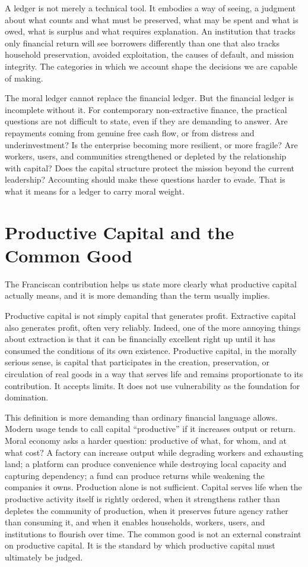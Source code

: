 \documentclass[11pt,a4paper,oneside]{book}
\begin{document}
A ledger is not merely a technical tool. It embodies a way of seeing, a judgment about what counts and what must be preserved, what may be spent and what is owed, what is surplus and what requires explanation. An institution that tracks only financial return will see borrowers differently than one that also tracks household preservation, avoided exploitation, the causes of default, and mission integrity. The categories in which we account shape the decisions we are capable of making.

The moral ledger cannot replace the financial ledger. But the financial ledger is incomplete without it. For contemporary non-extractive finance, the practical questions are not difficult to state, even if they are demanding to answer. Are repayments coming from genuine free cash flow, or from distress and underinvestment? Is the enterprise becoming more resilient, or more fragile? Are workers, users, and communities strengthened or depleted by the relationship with capital? Does the capital structure protect the mission beyond the current leadership? Accounting should make these questions harder to evade. That is what it means for a ledger to carry moral weight.

\section*{Productive Capital and the Common Good}

The Franciscan contribution helps us state more clearly what productive capital actually means, and it is more demanding than the term usually implies.

Productive capital is not simply capital that generates profit. Extractive capital also generates profit, often very reliably. Indeed, one of the more annoying things about extraction is that it can be financially excellent right up until it has consumed the conditions of its own existence. Productive capital, in the morally serious sense, is capital that participates in the creation, preservation, or circulation of real goods in a way that serves life and remains proportionate to its contribution. It accepts limits. It does not use vulnerability as the foundation for domination.

This definition is more demanding than ordinary financial language allows. Modern usage tends to call capital ``productive'' if it increases output or return. Moral economy asks a harder question: productive of what, for whom, and at what cost? A factory can increase output while degrading workers and exhausting land; a platform can produce convenience while destroying local capacity and capturing dependency; a fund can produce returns while weakening the companies it owns. Production alone is not sufficient. Capital serves life when the productive activity itself is rightly ordered, when it strengthens rather than depletes the community of production, when it preserves future agency rather than consuming it, and when it enables households, workers, users, and institutions to flourish over time. The common good is not an external constraint on productive capital. It is the standard by which productive capital must ultimately be judged.
\end{document}
